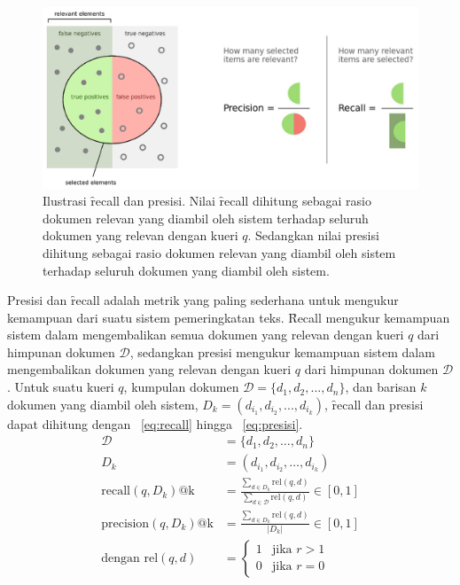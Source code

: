         \begin{figure}
            \centering
            \includegraphics[width=1\textwidth]{assets/pics/recall-presisi.png}
            \caption{Ilustrasi \f{recall} dan presisi. Nilai \f{recall} dihitung sebagai rasio dokumen relevan yang diambil oleh sistem terhadap seluruh dokumen yang relevan dengan kueri $q$. Sedangkan nilai presisi dihitung sebagai rasio dokumen relevan yang diambil oleh sistem terhadap seluruh dokumen yang diambil oleh sistem.}
            \label{fig:recall-precision}
        \end{figure}
        Presisi dan \f{recall} adalah metrik yang paling sederhana untuk mengukur kemampuan dari suatu sistem pemeringkatan teks. \f{Recall} mengukur kemampuan sistem dalam mengembalikan semua dokumen yang relevan dengan kueri $q$ dari himpunan dokumen $\mathcal{D}$, sedangkan presisi mengukur kemampuan sistem dalam mengembalikan dokumen yang relevan dengan kueri $q$ dari himpunan dokumen $\mathcal{D}$. Untuk suatu kueri $q$, kumpulan dokumen $\mathcal{D} = \{d_1, d_2, ..., d_n\}$, dan barisan $k$ dokumen yang diambil oleh sistem, $D_k = (d_{i_1}, d_{i_2}, ..., d_{i_k})$, \f{recall} dan presisi dapat dihitung dengan \equ~\ref{eq:recall} hingga \equ~\ref{eq:presisi}.
        \begin{align}
            \label{eq:recall}
            \mathcal{D} &= \{d_1, d_2, \dots, d_n\} \\
            D_k &= (d_{i_1}, d_{i_2}, \dots, d_{i_k}) \\
            \text{recall}(q, D_k)\text{@k} &= \frac{\sum_{d \in D_k} \text{rel}(q, d)}{\sum_{d \in \mathcal{D}} \text{rel}(q, d)} \in [0, 1] \\
            \label{eq:presisi}
            \text{precision}(q, D_k)\text{@k} &= \frac{\sum_{d \in D_k} \text{rel}(q, d)}{|D_k|} \in [0, 1] \\
            \label{eq:rel}
            \text{dengan } \text{rel}(q, d) &= \begin{cases} 
            1 & \text{jika } r > 1 \\
            0 & \text{jika } r = 0
            \end{cases}        
        \end{align}

